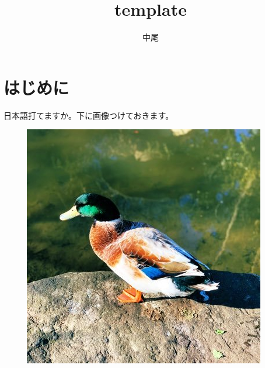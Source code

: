 \documentclass[a4paper]{jsarticle}
\begin{document}
\title{template}
\author{中尾}
\maketitle

\section{はじめに}

日本語打てますか。下に画像つけておきます。
\begin{figure}[h]
  \includegraphics[width=0.8\hsize]{kxMWriYJ_400x400.jpeg}
\end{figure}
\end{document}

